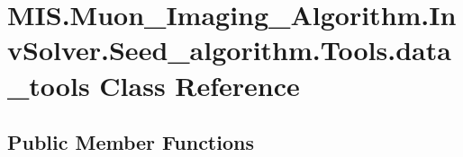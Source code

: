 \hypertarget{classMIS_1_1Muon__Imaging__Algorithm_1_1InvSolver_1_1Seed__algorithm_1_1Tools_1_1data__tools}{}\section{M\+I\+S.\+Muon\+\_\+\+Imaging\+\_\+\+Algorithm.\+Inv\+Solver.\+Seed\+\_\+algorithm.\+Tools.\+data\+\_\+tools Class Reference}
\label{classMIS_1_1Muon__Imaging__Algorithm_1_1InvSolver_1_1Seed__algorithm_1_1Tools_1_1data__tools}
\subsection*{Public Member Functions}
